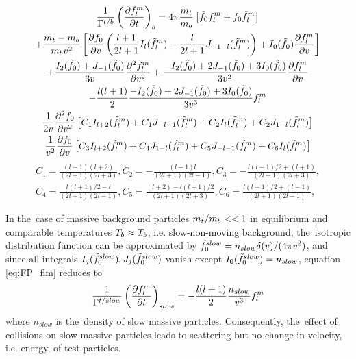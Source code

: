 \documentclass[preprint,12pt]{elsarticle}
\begin{document}
\begin{multline}
  \frac{1}{\Gamma^{t/b}}\left(\frac{\partial{f_l^m}}{\partial{t}}\right)_{b} = 
  4\pi\frac{m_t}{m_b} \left[\tilde{f}_0 f_l^m + f_0 \tilde{f}_l^m \right] 
  \\
  + \frac{m_t-m_b}{m_b v^2} \left[ \frac{\partial{f_0}}{\partial{v}}
  \left(\frac{l+1}{2 l+1} I_l(\tilde{f}_l^m) 
  - \frac{l}{2 l +1} J_{-1-l}(\tilde{f}_l^m)\right) 
  + I_0(\tilde{f}_0)\frac{\partial{f_l^m}}{\partial{v}}\right] 
  \\
  + \frac{I_2(\tilde{f}_0) + J_{-1}(\tilde{f}_0)}{3v}
  \frac{\partial^2 f_l^m}{\partial v^2} + 
  \frac{-I_2(\tilde{f}_0) + 2 J_{-1}(\tilde{f}_0) + 3 I_0(\tilde{f}_0)}{3v^2}
  \frac{\partial{f_l^m}}{\partial{v}}
  \\
  - \frac{l(l+1)}{2}
  \frac{-I_2(\tilde{f}_0) + 2 J_{-1}(\tilde{f}_0) + 3 I_0(\tilde{f}_0)}{3v^3} f_l^m 
  \\
  \frac{1}{2 v} \frac{\partial^2 f_0}{\partial v^2}
  \left[C_1 I_{l+2}(\tilde{f}_l^m) + C_1 J_{-l-1}(\tilde{f}_l^m) + C_2 I_l(\tilde{f}_l^m) 
  + C_2 J_{1-l}(\tilde{f}_l^m) \right]
  \\
  \frac{1}{v^2} \frac{\partial{f_0}}{\partial{v}}
  \left[C_3 I_{l+2}(\tilde{f}_l^m) + C_4 J_{1-l}(\tilde{f}_l^m) + C_5 J_{-l-1}(\tilde{f}_l^m) 
  + C_6 I_l(\tilde{f}_l^m) \right]
  \label{eq:FP_flm}
\end{multline}
\begin{eqnarray}
  C_1 = \frac{(l+1)(l+2)}{(2l+1)(2l+3)}, 
  C_2 = -\frac{(l-1)l}{(2l +1)(2l-1)},
  C_3 = -\frac{l(l+1)/2 + (l+1)}{(2l+1)(2l+3)},
  \nonumber \\
  C_4 = \frac{l(l+1)/2 - l}{(2l+1)(2l-1)},
  C_5 = \frac{(l+2) - l(l+1)/2}{(2l+1)(2l+3)}, 
  C_6 = \frac{l(l+1)/2 + (l-1)}{(2l+1)(2l-1)}, 
  \nonumber
\end{eqnarray}

In the~case of massive background particles $m_t / m_b << 1$ in equilibrium
and comparable temperatures $T_b\approx T_b$, 
i.e. slow-non-moving background, 
the~isotropic distribution function can be approximated by 
$\tilde{f}_0^{slow} = n_{slow} \delta(v) / (4\pi v^2)$, 
and since all integrals 
$I_j(\tilde{f}_0^{slow}), J_j(\tilde{f}_0^{slow})$ vanish except 
$I_0(\tilde{f}_0^{slow}) = n_{slow}$, equation \eqref{eq:FP_flm} reduces to 
\begin{equation}
  \frac{1}{\Gamma^{t/slow}}\left(\frac{\partial{f_l^m}}{\partial{t}}\right)_{slow} = 
  - \frac{l(l+1)}{2}
  \frac{n_{slow}}{v^3} f_l^m 
  \label{eq:FP_flm_slow}
\end{equation} 
where $n_{slow}$ is the~density of slow massive particles. Consequently, 
the~effect of collisions on slow massive particles leads to scattering but no
change in velocity, i.e. energy, of test particles.
\end{document}
